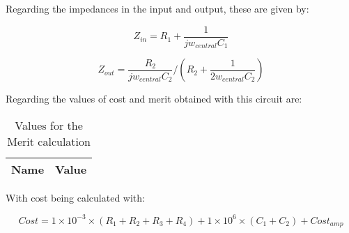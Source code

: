 Regarding the impedances in the input and output, these are given by:


\begin{equation}
    Z_{in}= R_1+\frac{1}{jw_{central} C_1}
\end{equation}


\begin{equation}
   Z_{out}= \frac{R_2}{jw_{central}C_2}/\left ( R_2+\frac{1}{2w_{central}C_2} \right )
\end{equation}


Regarding the values of cost and merit obtained with this circuit are:

\begin{table}[h]
  \centering
  \begin{tabular}{|l|r|}
    \hline    
    {\bf Name} & {\bf Value} \\ \hline
    
  \end{tabular}
  \caption{Values for the Merit calculation}
  \label{tab:merito}
\end{table}

With cost being calculated with:

\begin{equation}
    Cost = 1\times 10^{-3}\times \left ( R_1+R_2+R_3+R_4 \right )+1\times 10^{6}\times\left ( C_1+C_2 \right ) + Cost_{amp}
\end{equation}

